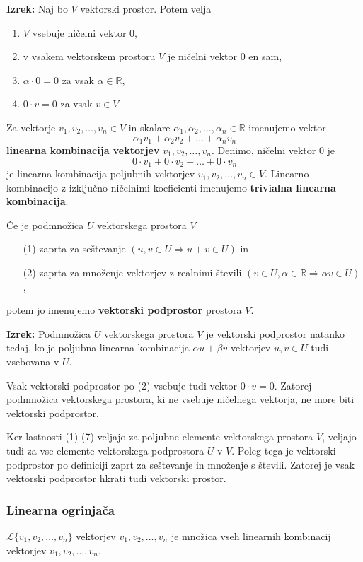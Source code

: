 \documentclass{article}
\begin{document}
\begin{multicols}{2}
\textbf{Izrek:} Naj bo \( V \) vektorski prostor. Potem velja
\begin{enumerate}
    \item \( V \) vsebuje ničelni vektor \( 0 \),
    \item v vsakem vektorskem prostoru \( V \) je ničelni vektor \( 0 \) en sam,
    \item \( \alpha \cdot 0 = 0 \) za vsak \( \alpha \in \mathbb{R} \),
    \item \( 0 \cdot v = 0 \) za vsak \( v \in V \).
\end{enumerate}
Za vektorje \( v_1, v_2, \ldots, v_n \in V \) in skalare \( \alpha_1, \alpha_2, \ldots, \alpha_n \in \mathbb{R} \) imenujemo vektor
\[ \alpha_1v_1 + \alpha_2v_2 + \ldots + \alpha_nv_n \]
\textbf{linearna kombinacija vektorjev} \( v_1, v_2, \ldots, v_n \).
Denimo, ničelni vektor \( 0 \) je
\[ 0 \cdot v_1 + 0 \cdot v_2 + \ldots + 0 \cdot v_n \]
je linearna kombinacija poljubnih vektorjev \( v_1, v_2, \ldots, v_n \in V \). Linearno kombinacijo z izključno ničelnimi koeficienti imenujemo \textbf{trivialna linearna kombinacija}.

Če je podmnožica \( U \) vektorskega prostora \( V \)
\begin{itemize}
    \item[(1)] zaprta za seštevanje \( (u, v \in U \Rightarrow u + v \in U) \) in
    \item[(2)] zaprta za množenje vektorjev z realnimi števili \( (v \in U, \alpha \in \mathbb{R} \Rightarrow \alpha v \in U) \),
\end{itemize}
potem jo imenujemo \textbf{vektorski podprostor} prostora \( V \).

\textbf{Izrek:} Podmnožica \( U \) vektorskega prostora \( V \) je vektorski podprostor natanko tedaj, ko je poljubna linearna kombinacija \( \alpha u + \beta v \) vektorjev \( u, v \in U \) tudi vsebovana v \( U \).

Vsak vektorski podprostor po (2) vsebuje tudi vektor \( 0 \cdot v = 0 \). Zatorej podmnožica vektorskega prostora, ki ne vsebuje ničelnega vektorja, ne more biti vektorski podprostor.

Ker lastnosti (1)-(7) veljajo za poljubne elemente vektorskega prostora \( V \), veljajo tudi za vse elemente vektorskega podprostora \( U \) v \( V \). Poleg tega je vektorski podprostor po definiciji zaprt za seštevanje in množenje s števili. Zatorej je vsak vektorski podprostor hkrati tudi vektorski prostor.

\subsubsection{Linearna ogrinjača} \( \mathcal{L}\{v_1, v_2, \ldots, v_n\} \) vektorjev \( v_1, v_2, \ldots, v_n \) je množica vseh linearnih kombinacij vektorjev \( v_1, v_2, \ldots, v_n \).


\end{multicols}
\end{document}
